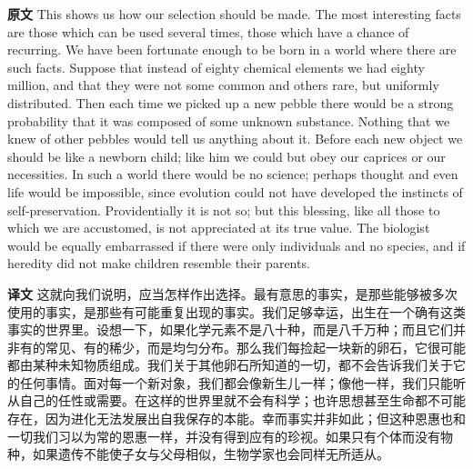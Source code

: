 \documentclass[UTF8]{ctexart}
\newenvironment{english}{\par\small\noindent\textbf{原文}\quad\ignorespaces}{\par}
\newenvironment{zhtranslation}{\par\noindent\textbf{译文}\quad\ignorespaces}{\par\vspace{0.35em}}
\begin{document}
\begin{english}
This shows us how our selection should be made. The most interesting facts are those which can be used several times, those which have a chance of recurring. We have been fortunate enough to be born in a world where there are such facts. Suppose that instead of eighty chemical elements we had eighty million, and that they were not some common and others rare, but uniformly distributed. Then each time we picked up a new pebble there would be a strong probability that it was composed of some unknown substance. Nothing that we knew of other pebbles would tell us anything about it. Before each new object we should be like a newborn child; like him we could but obey our caprices or our necessities. In such a world there would be no science; perhaps thought and even life would be impossible, since evolution could not have developed the instincts of self-preservation. Providentially it is not so; but this blessing, like all those to which we are accustomed, is not appreciated at its true value. The biologist would be equally embarrassed if there were only individuals and no species, and if heredity did not make children resemble their parents.
\end{english}
\begin{zhtranslation}
这就向我们说明，应当怎样作出选择。最有意思的事实，是那些能够被多次使用的事实，是那些有可能重复出现的事实。我们足够幸运，出生在一个确有这类事实的世界里。设想一下，如果化学元素不是八十种，而是八千万种；而且它们并非有的常见、有的稀少，而是均匀分布。那么我们每捡起一块新的卵石，它很可能都由某种未知物质组成。我们关于其他卵石所知道的一切，都不会告诉我们关于它的任何事情。面对每一个新对象，我们都会像新生儿一样；像他一样，我们只能听从自己的任性或需要。在这样的世界里就不会有科学；也许思想甚至生命都不可能存在，因为进化无法发展出自我保存的本能。幸而事实并非如此；但这种恩惠也和一切我们习以为常的恩惠一样，并没有得到应有的珍视。如果只有个体而没有物种，如果遗传不能使子女与父母相似，生物学家也会同样无所适从。\end{zhtranslation}
\end{document}
